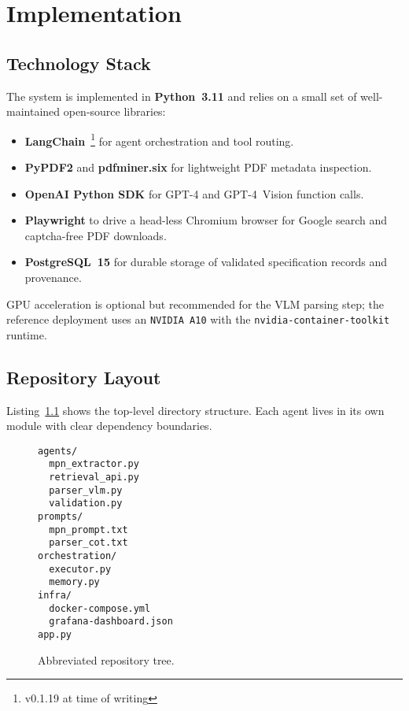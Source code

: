 \chapter{Implementation}
\label{chapter:implementation}

\section{Technology Stack}
The system is implemented in \textbf{Python~3.11} and relies on a small set of well-maintained open-source libraries:
\begin{itemize}
  \item \textbf{LangChain}~\footnote{v0.1.19 at time of writing} for agent orchestration and tool routing.
  \item \textbf{PyPDF2} and \textbf{pdfminer.six} for lightweight PDF metadata inspection.
  \item \textbf{OpenAI Python SDK} for GPT-4 and GPT-4~Vision function calls.
  \item \textbf{Playwright} to drive a head-less Chromium browser for Google search and captcha-free PDF downloads.
  \item \textbf{PostgreSQL~15} for durable storage of validated specification records and provenance.
\end{itemize}
GPU acceleration is optional but recommended for the VLM parsing step; the reference deployment uses an \texttt{NVIDIA~A10} with the \texttt{nvidia-container-toolkit} runtime.

\section{Repository Layout}
Listing~\ref{lst:tree} shows the top-level directory structure.  Each agent lives in its own module with clear dependency boundaries.
\begin{figure}[H]
\centering
\begin{minipage}{0.9\textwidth}
\begin{verbatim}
agents/
  mpn_extractor.py
  retrieval_api.py
  parser_vlm.py
  validation.py
prompts/ 
  mpn_prompt.txt
  parser_cot.txt
orchestration/
  executor.py
  memory.py
infra/
  docker-compose.yml
  grafana-dashboard.json
app.py
\end{verbatim}
\end{minipage}
\caption{Abbreviated repository tree.}
\label{lst:tree}
\end{figure}

